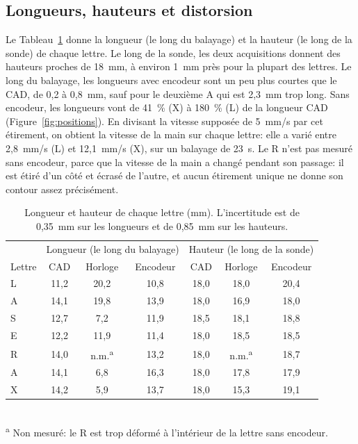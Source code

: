 \documentclass[11pt,letterpaper]{article}
\begin{document}
\subsection{Longueurs, hauteurs et distorsion}
\label{sec:res_plan}

Le Tableau~\ref{tab:lettres} donne la longueur (le long du balayage) et la hauteur (le long de la sonde) de chaque lettre. Le long de la sonde, les deux acquisitions donnent des hauteurs proches de 18~mm, à environ 1~mm près pour la plupart des lettres. Le long du balayage, les longueurs avec encodeur sont un peu plus courtes que le CAD, de 0,2 à 0,8~mm, sauf pour le deuxième A qui est 2,3~mm trop long. Sans encodeur, les longueurs vont de 41~\% (X) à 180~\% (L) de la longueur CAD (Figure~\ref{fig:positions}). En divisant la vitesse supposée de 5~mm/s par cet étirement, on obtient la vitesse de la main sur chaque lettre: elle a varié entre 2,8~mm/s (L) et 12,1~mm/s (X), sur un balayage de 23~s. Le R n'est pas mesuré sans encodeur, parce que la vitesse de la main a changé pendant son passage: il est étiré d'un côté et écrasé de l'autre, et aucun étirement unique ne donne son contour assez précisément.

\begin{table}[htbp]
\centering
\caption{Longueur et hauteur de chaque lettre (mm). L'incertitude est de 0,35~mm sur les longueurs et de 0,85~mm sur les hauteurs.}
\label{tab:lettres}
\small
\begin{tabular}{lcccccc}
\hline
 & \multicolumn{3}{c}{Longueur (le long du balayage)} & \multicolumn{3}{c}{Hauteur (le long de la sonde)} \\
Lettre & CAD & Horloge & Encodeur & CAD & Horloge & Encodeur \\
\hline
L & 11,2 & 20,2 & 10,8 & 18,0 & 18,0 & 20,4 \\
A & 14,1 & 19,8 & 13,9 & 18,0 & 16,9 & 18,0 \\
S & 12,7 & 7,2  & 11,9 & 18,5 & 18,1 & 18,8 \\
E & 12,2 & 11,9 & 11,4 & 18,0 & 18,5 & 18,5 \\
R & 14,0 & n.m.\textsuperscript{a} & 13,2 & 18,0 & n.m.\textsuperscript{a} & 18,7 \\
A & 14,1 & 6,8  & 16,3 & 18,0 & 17,8 & 17,9 \\
X & 14,2 & 5,9  & 13,7 & 18,0 & 15,3 & 19,1 \\
\hline
\end{tabular}
\\[0.3em]
{\footnotesize \textsuperscript{a} Non mesuré: le R est trop déformé à l'intérieur de la lettre sans encodeur.}
\end{table}
\end{document}
